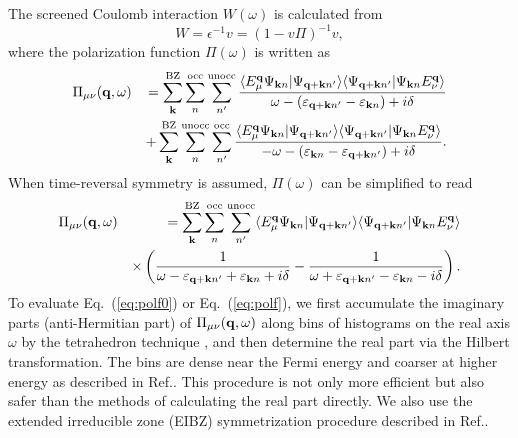 \documentclass[a4paper,10pt,epsf,fleqn]{article}
\def\Psikn{\Psi_{{\bf k}n}}
\def\Psikn{{\Psi_{{\bf k}n}}}
\newcommand{\bfq}{{\bf q}}
\newcommand{\bfk}{{\bf k}}
\newcommand{\ispone}{}
\newcommand{\isptwo}{}
\newcommand{\req}[1]{\mbox{Eq.~(\ref{#1})}}
\begin{document}
The screened Coulomb interaction $W(\omega)$ is calculated from
\begin{equation}
 W = \epsilon^{-1} v = \left(1-v \Pi\right)^{-1} v,
\label{eq:defw}
\end{equation}
where the polarization function $\Pi(\omega)$
is written as
\begin{eqnarray}
\Pi_{\mu \nu}({\bf q},\omega)
&&=
\sum^{\rm BZ}_{\bfk} \sum^{\rm occ}_{n \ispone} \sum^{\rm unocc}_{n'\isptwo}
\frac{
\langle E^{\bf q}_\mu \Psikn |\Psi_{{\bf q+k}n'} \rangle
\langle \Psi_{{\bf q+k}n'}| \Psikn E^{\bf q}_\nu \rangle
}{\omega-(\varepsilon_{{\bf q+k} n'\isptwo}-\varepsilon_{\bfk n\ispone})+i \delta} \nonumber\\
&&+ \sum^{\rm BZ}_{\bfk} \sum^{\rm  unocc}_{n \ispone} \sum^{\rm occ}_{n'\isptwo}
\frac{
\langle E^{\bf q}_\mu \Psi_{{\bf k}n} |\Psi_{{\bf q+k}n'} \rangle
\langle \Psi_{{\bf q+k}n'}| \Psi_{{\bf k}n} E^{\bf q}_\nu \rangle
}{-\omega-(\varepsilon_{\bfk n\ispone}-\varepsilon_{{\bf q+k} n'\isptwo})+i \delta}.
\label{eq:polf0}
\end{eqnarray}
When time-reversal symmetry is assumed, $\Pi(\omega)$ can be simplified to read
\begin{eqnarray}
\Pi_{\mu \nu}({\bf q},\omega)
&&=\sum^{\rm BZ}_{{\bf k}}  \sum^{\rm  occ}_{n} \sum^{\rm  unocc}_{n'}
\langle E^{\bf q}_\mu \Psi_{{\bf k}n} |\Psi_{{\bf q+k}n'} \rangle
\langle \Psi_{{\bf q+k}n'}| \Psi_{{\bf k}n} E^{\bf q}_\nu \rangle \nonumber \\
&& \times
\left(\frac{1}{\omega-\varepsilon_{{\bf q+k}n'}+\varepsilon_{{\bf k}n}+i \delta}
-\frac{1}{\omega+\varepsilon_{{\bf q+k}n'}-\varepsilon_{{\bf k}n}-i \delta}\right). \label{dieele}
\label{eq:polf}
\end{eqnarray}
To evaluate \req{eq:polf0} or \req{eq:polf},
we first accumulate the imaginary parts (anti-Hermitian part) of $\Pi_{\mu \nu}(\bfq,\omega)$
along bins of histograms on the real axis $\omega$
by the tetrahedron technique \cite{rath_generalized_1975},
and then determine the real part via the Hilbert transformation.
The bins are dense near the Fermi energy and coarser at higher energy as described in 
Ref.\cite{kotani_quasiparticle_2007}.
This procedure is not only more efficient but also safer than the methods
of calculating the real part directly. 
We also use the extended irreducible zone (EIBZ) 
symmetrization procedure described in Ref.\cite{friedrich_efficient_2010}.
\end{document}

